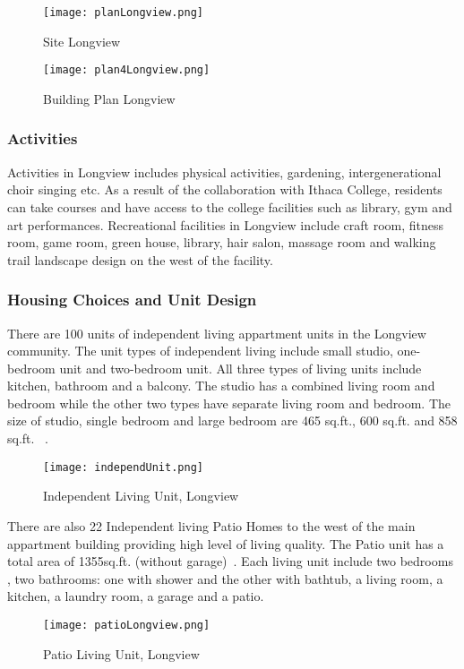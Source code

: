 \begin{figure}[htbp]
  \centering
  \texttt{[image: planLongview.png]}
  \caption[Site Plan, Longview]{Site Longview~\cite{patioLongview}}
  \label{fig:planLongview}
\end{figure}

\begin{figure}[htbp]
  \centering
  \texttt{[image: plan4Longview.png]}
  \caption[Building Plan, Longview]{Building Plan
    Longview~\cite{plan4Longview}}
  \label{fig:plan4Longview}
\end{figure}
\subsubsection{Activities}
Activities in Longview includes physical activities, gardening,
intergenerational choir singing etc. As a result of the collaboration
with Ithaca College, residents can take courses and have access to  
the college facilities such as library, gym and art
performances. Recreational facilities in Longview include craft room,
fitness room, game room, green house, library, hair salon, massage
room and walking trail landscape design on the west of the facility.

\subsubsection{Housing Choices and Unit Design}
There are 100 units of independent living appartment units in the
Longview community. The unit types of independent living include small
studio, one-bedroom unit and two-bedroom unit. All three types of
living units include kitchen, bathroom and a balcony. The studio has a
combined living room and bedroom while the other two types have
separate living room and bedroom. The size of studio, single bedroom
and large bedroom are 465 sq.ft., 600 sq.ft. and 858
sq.ft. ~\cite{LongviewIndepend}.
\begin{figure}[htbp]
  \centering
  \texttt{[image: independUnit.png]}
  \caption[Independent Living Unit, Longview]{Independent Living
    Unit, Longview~\cite{LongviewIndepend}}
  \label{fig:independUnit}
\end{figure}

There are also 22 Independent living Patio Homes to the west of the
main appartment building providing high level of living
quality. The Patio unit has a total area of 1355sq.ft. (without
garage)~\cite{LongviewPatio}. Each living unit include two bedrooms ,
two bathrooms: one with shower and the other with bathtub, a living
room, a kitchen, a laundry room, a garage and a patio.
\begin{figure}[htbp]
  \centering
  \texttt{[image: patioLongview.png]}
  \caption[Patio Living Unit, Longview]{Patio Living
    Unit, Longview~\cite{patioLongview}}
  \label{fig:patioLongview}
\end{figure}

